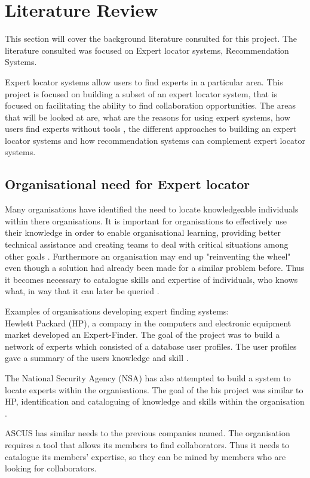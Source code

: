 \documentclass[a4paper,oneside,11pt]{report}
\begin{document}
\chapter{Literature Review}
This section will cover the background literature consulted for this project. The literature consulted was focused on Expert locator systems, Recommendation Systems. 

Expert locator systems allow users to find experts in a particular area.
This project is focused on building a subset of an expert locator system, that is focused on facilitating the ability to find collaboration opportunities. The areas that will be looked at are, what are the reasons for using expert systems, how users find experts without tools , the different approaches to building an expert locator systems and how recommendation systems can complement expert locator systems.
\section{Organisational need for Expert locator}
Many organisations have identified the need to locate knowledgeable individuals within there organisations. It is important for organisations to effectively use their knowledge in order to enable organisational learning, providing better technical assistance and creating teams to deal with critical situations among other goals  \autocite{ackerman2003sharing}. Furthermore an organisation may end up "reinventing the wheel" even though a solution had already been made for a similar problem before. Thus it becomes necessary to catalogue skills and expertise of individuals, who knows what,  in way that it can later be queried \autocite{fernandez2000}.

Examples of organisations developing expert finding systems: \\
Hewlett Packard (HP), a company in the computers and electronic equipment market developed  an Expert-Finder. The goal of the project was to build a network of experts which consisted of a database user profiles. The user profiles gave a summary of the users knowledge and skill \autocite{fernandez2000}.
 
The National Security Agency (NSA) has also attempted to build a system to locate experts within the organisations. The goal of the his project was similar to HP, identification and cataloguing of knowledge and skills within the organisation \autocite{fernandez2000}.

ASCUS has similar needs to the previous companies named. The organisation requires a tool that allows its members to find collaborators. Thus it needs to catalogue its members' expertise, so they can be mined by members who are looking for collaborators. 
	
\end{document}
